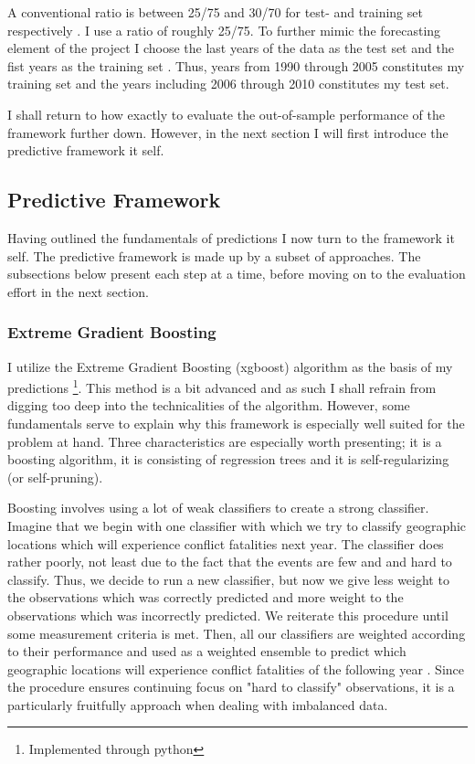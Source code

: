 \documentclass[a4paper]{article}
\begin{document}
A conventional ratio is between 25/75 and 30/70 for test- and training set respectively \citep{Friedman_2001, Ward_Greenhill_Bakke_2010}. I use a ratio of roughly 25/75. To further mimic the forecasting element of the project I choose the last years of the data as the test set and the fist years as the training set \citep{Goldstone_2010}. Thus, years from 1990 through 2005 constitutes my training set and the years including 2006 through 2010 constitutes my test set.\par

I shall return to how exactly to evaluate the out-of-sample performance of the framework further down. However, in the next section I will first introduce the predictive framework it self.\par

\subsection{Predictive Framework}

Having outlined the fundamentals of predictions I now turn to the framework it self. The predictive framework is made up by a subset of approaches. The subsections below present each step at a time, before moving on to the evaluation effort in the next section.\par

\subsubsection{Extreme Gradient Boosting}

I utilize the Extreme Gradient Boosting (xgboost) algorithm as the basis of my predictions \citep{Chen_2016}\footnote{Implemented through python}. This method is a bit advanced and as such I shall refrain from digging too deep into the technicalities of the algorithm. However, some fundamentals serve to explain why this framework is especially well suited for the problem at hand. Three characteristics are especially worth presenting; it is a boosting algorithm, it is consisting of regression trees and it is self-regularizing (or self-pruning).

Boosting involves using a lot of weak classifiers to create a strong classifier. Imagine that we begin with one classifier with which we try to classify geographic locations which will experience conflict fatalities next year. The classifier does rather poorly, not least due to the fact that the events are few and and hard to classify. Thus, we decide to run a new classifier, but now we give less weight to the observations which was correctly predicted and more weight to the observations which was incorrectly predicted. We reiterate this procedure until some measurement criteria is met. Then, all our classifiers are weighted according to their performance and used as a weighted ensemble to predict which geographic locations will experience conflict fatalities of the following year \citep[338-339]{Friedman_2001}. Since the procedure ensures continuing focus on "hard to classify" observations, it is a particularly fruitfully approach when dealing with imbalanced data.\par
\end{document}
